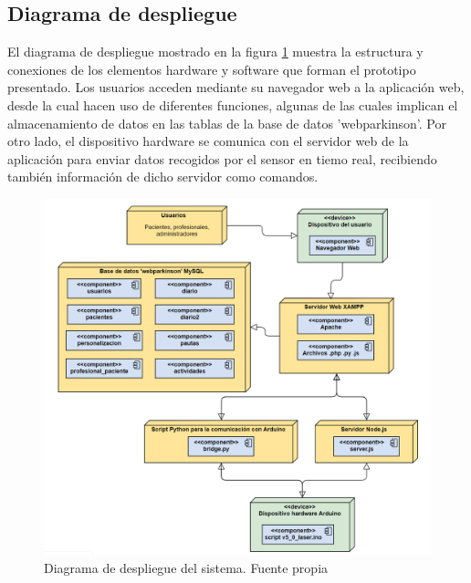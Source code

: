 \subsection{Diagrama de despliegue}
El diagrama de despliegue mostrado en la figura \ref{fig:diagramadespliegue} muestra la estructura y conexiones de los elementos hardware y software que forman el prototipo presentado. Los usuarios acceden mediante su navegador web a la aplicación web, desde la cual hacen uso de diferentes funciones, algunas de las cuales implican el almacenamiento de datos en las tablas de la base de datos 'webparkinson'. Por otro lado, el dispositivo hardware se comunica con el servidor web de la aplicación para enviar datos recogidos por el sensor en tiemo real, recibiendo también información de dicho servidor como comandos.
\begin{figure}[h]
    \centering
    \includegraphics[width=1\textwidth]{img/diagramadespliegue.png}
    \caption{Diagrama de despliegue del sistema. Fuente propia}
    \label{fig:diagramadespliegue}
\end{figure}


